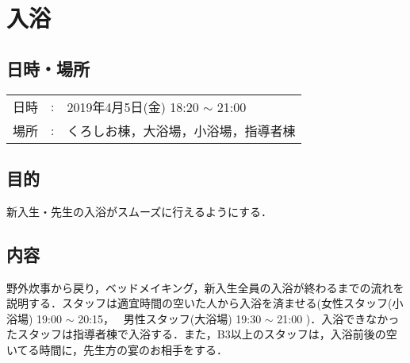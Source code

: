 %
\section{入浴}


\subsection{日時・場所}
\begin{tabular}{p{}rp{}}
  日時 & : & 2019年4月5日(金) 18:20 $\sim$ 21:00\\
  場所 & : & くろしお棟，大浴場，小浴場，指導者棟
\end{tabular}


\subsection{目的}
新入生・先生の入浴がスムーズに行えるようにする．

\subsection{内容}
野外炊事から戻り，ベッドメイキング，新入生全員の入浴が終わるまでの流れを説明する．スタッフは適宜時間の空いた人から入浴を済ませる(女性スタッフ(小浴場) 19:00  $\sim$ 20:15，
\ 男性スタッフ(大浴場) 19:30 $\sim$ 21:00
)．入浴できなかったスタッフは指導者棟で入浴する．また，B3以上のスタッフは，入浴前後の空いてる時間に，先生方の宴のお相手をする．


